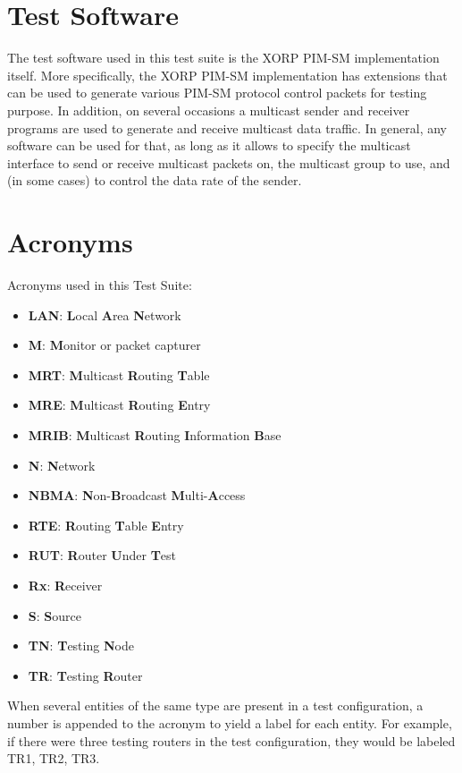 \documentclass[11pt]{report}
\begin{document}
\section{Test Software}

The test software used in this test suite is the XORP PIM-SM implementation
itself. More specifically, the XORP PIM-SM implementation has extensions that
can be used to generate various PIM-SM protocol control packets for testing
purpose. In addition, on several occasions a multicast sender and receiver
programs are used to generate and receive multicast data traffic. In general,
any software can be used for that, as long as it allows to specify the
multicast interface to send or receive multicast packets on, the multicast
group to use, and (in some cases) to control the data rate of the sender.

\section{Acronyms}

Acronyms used in this Test Suite:

\begin{itemize}
  \item {\bf LAN}: {\bf L}ocal {\bf A}rea {\bf N}etwork
  \item {\bf M}: {\bf M}onitor or packet capturer
  \item {\bf MRT}: {\bf M}ulticast {\bf R}outing {\bf T}able
  \item {\bf MRE}: {\bf M}ulticast {\bf R}outing {\bf E}ntry
  \item {\bf MRIB}: {\bf M}ulticast {\bf R}outing {\bf I}nformation {\bf B}ase
  \item {\bf N}: {\bf N}etwork
  \item {\bf NBMA}: {\bf N}on-{\bf B}roadcast {\bf M}ulti-{\bf A}ccess
  \item {\bf RTE}: {\bf R}outing {\bf T}able {\bf E}ntry
  \item {\bf RUT}: {\bf R}outer {\bf U}nder {\bf T}est
  \item {\bf Rx}: {\bf R}eceiver
  \item {\bf S}: {\bf S}ource
  \item {\bf TN}: {\bf T}esting {\bf N}ode
  \item {\bf TR}: {\bf T}esting {\bf R}outer
\end{itemize}

When several entities of the same type are present in a test configuration, a
number is appended to the acronym to yield a label for each entity. For
example, if there were three testing routers in the test configuration, they
would be labeled TR1, TR2, TR3.
\end{document}
